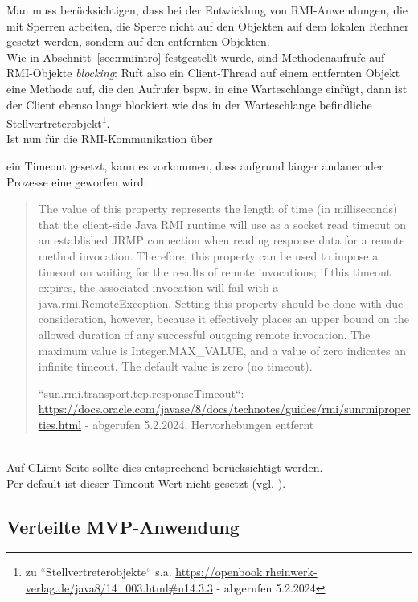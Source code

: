 \noindent
Man muss berücksichtigen, dass bei der Entwicklung von RMI-Anwendungen, die mit Sperren arbeiten, die Sperre nicht auf den Objekten auf dem lokalen Rechner gesetzt werden, sondern auf den entfernten Objekten. \\
Wie in Abschnitt~\ref{sec:rmiintro} festgestellt wurde, sind Methodenaufrufe auf RMI-Objekte \textit{blocking}: Ruft also ein Client-Thread auf einem entfernten Objekt eine Methode auf, die den Aufrufer bspw. in eine Warteschlange einfügt, dann ist der Client ebenso lange blockiert wie das in der Warteschlange befindliche Stellvertreterobjekt\footnote{
zu ``Stellvertreterobjekte`` s.a. \url{https://openbook.rheinwerk-verlag.de/java8/14_003.html#u14.3.3} - abgerufen 5.2.2024
}.\\
Ist nun für die RMI-Kommunikation über \begin{center}\end{center} ein Timeout gesetzt, kann es vorkommen, dass aufgrund länger andauernder Prozesse eine  geworfen wird:

\blockquote[{``sun.rmi.transport.tcp.responseTimeout``: \url{https://docs.oracle.com/javase/8/docs/technotes/guides/rmi/sunrmiproperties.html} - abgerufen 5.2.2024, Hervorhebungen entfernt}]{
    The value of this property represents the length of time (in milliseconds) that the client-side Java RMI runtime will use as a socket read timeout on an established JRMP connection when reading response data for a remote method invocation. Therefore, this property can be used to impose a timeout on waiting for the results of remote invocations; if this timeout expires, the associated invocation will fail with a java.rmi.RemoteException. Setting this property should be done with due consideration, however, because it effectively places an upper bound on the allowed duration of any successful outgoing remote invocation. The maximum value is Integer.MAX\_VALUE, and a value of zero indicates an infinite timeout. The default value is zero (no timeout).
}\\

\noindent
Auf CLient-Seite sollte dies entsprechend berücksichtigt werden.\\
Per default ist dieser Timeout-Wert nicht gesetzt (vgl. \cite[359]{Oec22}).

\subsection{Verteilte MVP-Anwendung}

